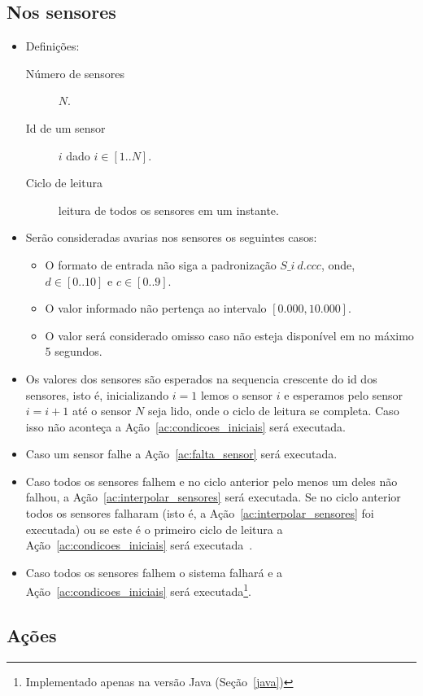 \documentclass[a4paper,10pt]{article}
\begin{document}
\subsection{Nos sensores}\label{sec:av_sensor}
\begin{itemize}
	\item Definições:
		\begin{description}
			\item[Número de sensores] $N$.
			\item[Id de um sensor] $i$ dado $i\in[1..N]$.
			\item[Ciclo de leitura] leitura de todos os sensores em um instante.
		\end{description}
	\item Serão consideradas avarias nos sensores os seguintes casos:
	\begin{itemize}
		\item O formato de entrada não siga a padronização $S\_i~d.ccc$,
			onde, $d\in[0..10]$ e $c\in[0..9]$.
		\item O valor informado não pertença ao intervalo
			$[0.000,10.000]$.
		\item O valor será considerado omisso caso não esteja disponível em no máximo
			5 segundos.
	\end{itemize}
	\item Os valores dos sensores são esperados na sequencia crescente do id
		dos sensores, isto é, inicializando $i=1$ lemos o sensor $i$ e esperamos
		pelo sensor $i=i+1$ até o sensor $N$ seja lido, onde o ciclo de leitura
		se completa.
		Caso isso não aconteça a Ação~\ref{ac:condicoes_iniciais} será
		executada.
	\item Caso um sensor falhe a Ação~\ref{ac:falta_sensor} será executada.
	\item Caso todos os sensores falhem e no ciclo anterior pelo menos um deles
		não falhou, a Ação~\ref{ac:interpolar_sensores} será executada. Se no ciclo anterior
		todos os sensores falharam (isto é, a Ação~\ref{ac:interpolar_sensores}
		foi executada) ou se este é o primeiro ciclo de
		leitura a Ação~\ref{ac:condicoes_iniciais} será
		executada~.
	\item Caso todos os sensores falhem o sistema falhará e a
		Ação~\ref{ac:condicoes_iniciais} será executada\footnote{Implementado
		apenas na versão Java (Seção~\ref{java})\label{ft:java}}.
\end{itemize}

\subsection{Ações}
\end{document}
